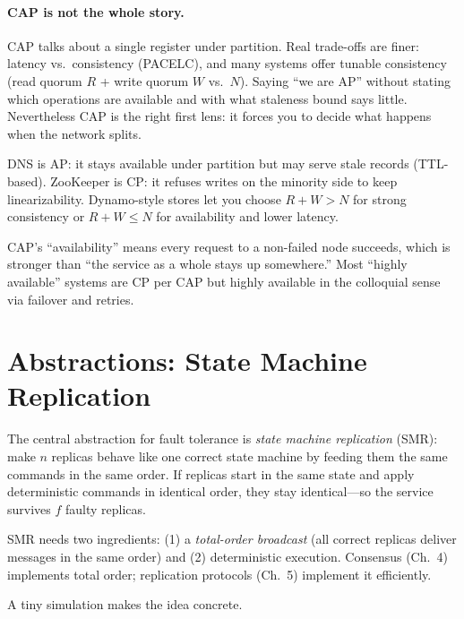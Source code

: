 \paragraph{CAP is not the whole story.} CAP talks about a single register under partition. Real trade-offs are finer: latency vs.\ consistency (PACELC), and many systems offer tunable consistency (read quorum $R$ + write quorum $W$ vs.\ $N$). Saying ``we are AP'' without stating which operations are available and with what staleness bound says little. Nevertheless CAP is the right first lens: it forces you to decide what happens when the network splits.

\begin{example}
DNS is AP: it stays available under partition but may serve stale records (TTL-based). ZooKeeper is CP: it refuses writes on the minority side to keep linearizability. Dynamo-style stores let you choose $R+W>N$ for strong consistency or $R+W\le N$ for availability and lower latency.
\end{example}

\begin{remark}
CAP's ``availability'' means every request to a non-failed node succeeds, which is stronger than ``the service as a whole stays up somewhere.'' Most ``highly available'' systems are CP per CAP but highly available in the colloquial sense via failover and retries.
\end{remark}

\section{Abstractions: State Machine Replication}
\label{sec:smr}
The central abstraction for fault tolerance is \emph{state machine replication} (SMR): make $n$ replicas behave like one correct state machine by feeding them the same commands in the same order. If replicas start in the same state and apply deterministic commands in identical order, they stay identical---so the service survives $f$ faulty replicas.

SMR needs two ingredients: (1) a \emph{total-order broadcast} (all correct replicas deliver messages in the same order) and (2) deterministic execution. Consensus (Ch.~4) implements total order; replication protocols (Ch.~5) implement it efficiently.

A tiny simulation makes the idea concrete.

